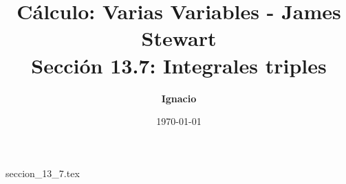 \documentclass[11pt,spanish,oneside]{report}
\title{\textbf{Cálculo: Varias Variables - James Stewart} \\ \Large Sección 13.7: Integrales triples}
\author{\textbf{Ignacio}}
\date{\today}
\begin{document}
\maketitle

{seccion_13_7.tex}
\end{document}
